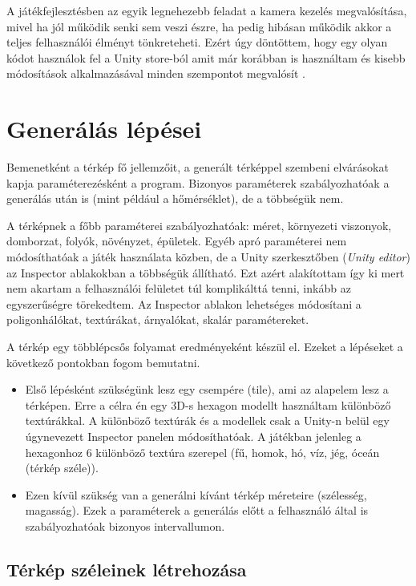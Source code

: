A játékfejlesztésben az egyik legnehezebb feladat a kamera kezelés megvalósítása, mivel ha jól működik senki sem veszi észre, ha pedig hibásan működik akkor a teljes felhasználói élményt tönkreteheti. Ezért úgy döntöttem, hogy egy olyan kódot használok fel a Unity store-ból amit már korábban is használtam és kisebb módosítások alkalmazásával minden szempontot megvalósít \cite{RTS_Camera}.

\section{Generálás lépései}

Bemenetként a térkép fő jellemzőit, a generált térképpel szembeni elvárásokat kapja paraméterezésként a program. Bizonyos paraméterek szabályozhatóak a generálás után is (mint például a hőmérséklet), de a többségük nem.

A térképnek a főbb paraméterei szabályozhatóak: méret, környezeti viszonyok, domborzat, folyók, növényzet, épületek. Egyéb apró paraméterei nem módosíthatóak a játék használata közben, de a Unity szerkesztőben (\textit{Unity editor}) az Inspector ablakokban a többségük állítható. Ezt azért alakítottam így ki mert nem akartam a felhasználói felületet túl komplikálttá tenni, inkább az egyszerűségre törekedtem. Az Inspector ablakon lehetséges módosítani a poligonhálókat, textúrákat, árnyalókat, skalár paramétereket.

A térkép egy többlépcsős folyamat eredményeként készül el. Ezeket a lépéseket a következő pontokban fogom bemutatni.
\begin{itemize}
\item Első lépésként szükségünk lesz egy csempére (tile), ami az alapelem lesz a térképen. Erre a célra én egy 3D-s hexagon modellt használtam különböző textúrákkal. A különböző textúrák és a modellek csak a Unity-n belül egy úgynevezett Inspector panelen módosíthatóak. A játékban jelenleg a hexagonhoz 6 különböző textúra szerepel (fű, homok, hó, víz, jég, óceán (térkép széle)).
\item Ezen kívül szükség van a generálni kívánt térkép méreteire (szélesség, magasság). Ezek a paraméterek a generálás előtt a felhasználó által is szabályozhatóak bizonyos intervallumon.
\end{itemize}

\subsection{Térkép széleinek létrehozása}

